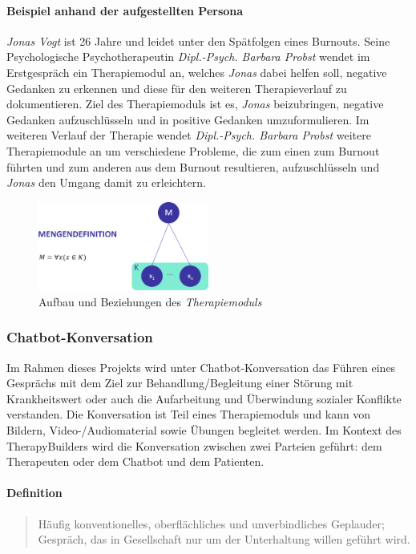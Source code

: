 \paragraph{Beispiel anhand der aufgestellten Persona}
 \emph{Jonas Vogt} ist 26 Jahre und leidet unter den Spätfolgen eines Burnouts. Seine Psychologische Psychotherapeutin \emph{Dipl.-Psych. Barbara Probst} wendet im Erstgespräch ein Therapiemodul an, welches \emph{Jonas} dabei helfen soll, negative Gedanken zu erkennen und diese für den weiteren Therapieverlauf zu dokumentieren. Ziel des Therapiemoduls ist es, \emph{Jonas} beizubringen, negative Gedanken aufzuschlüsseln und in positive Gedanken umzuformulieren. Im weiteren Verlauf der Therapie wendet \emph{Dipl.-Psych. Barbara Probst} weitere Therapiemodule an um verschiedene Probleme, die zum einen zum Burnout führten und zum anderen aus dem Burnout resultieren, aufzuschlüsseln und \emph{Jonas} den Umgang damit zu erleichtern.

\begin{figure}[h]
\centering
\includegraphics[width=0.5\textwidth]{pictures/moduldef}
\caption{Aufbau und Beziehungen des \emph{Therapiemoduls}}
\label{moduldef}
\end{figure}

\subsubsection{Chatbot-Konversation}
Im Rahmen dieses Projekts wird unter Chatbot-Konversation das Führen  eines Gesprächs mit dem Ziel zur Behandlung/Begleitung einer Störung mit Krankheitswert oder auch die Aufarbeitung und Überwindung sozialer Konflikte verstanden. Die Konversation ist Teil eines Therapiemoduls und kann von Bildern, Video-/Audiomaterial sowie Übungen begleitet werden. Im Kontext des TherapyBuilders wird die Konversation zwischen zwei Parteien geführt: dem Therapeuten oder dem Chatbot und dem Patienten.

\paragraph{Definition}
\begin{quote}
Häufig konventionelles, oberflächliches und unverbindliches Geplauder; Gespräch, das in Gesellschaft nur um der Unterhaltung willen geführt wird. \cite{DudenKon2:online}
\end{quote}

